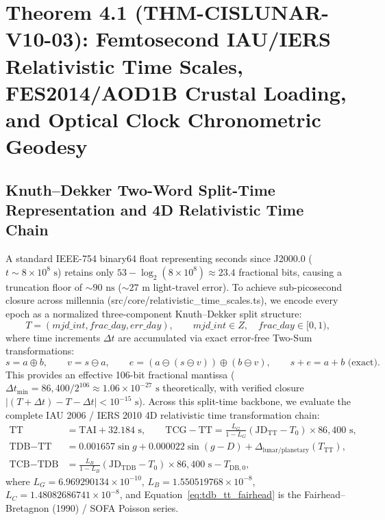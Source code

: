 \documentclass[11pt,a4paper,reqno]{article}
\def\texttt#1{#1}%
\def\mathcal#1{#1}%
\def\mathbb#1{#1}%
\theoremstyle{plain}
\theoremstyle{definition}
\theoremstyle{remark}
\numberwithin{equation}{section}
\begin{document}
\section{\texorpdfstring{Theorem 4.1 (\texttt{THM-CISLUNAR-V10-03}): Femtosecond IAU/IERS Relativistic Time Scales, FES2014/AOD1B Crustal Loading, and Optical Clock Chronometric Geodesy}{Theorem 4.1 (THM-CISLUNAR-V10-03): Femtosecond IAU/IERS Relativistic Time Scales, FES2014/AOD1B Crustal Loading, and Optical Clock Chronometric Geodesy}}

\subsection{Knuth--Dekker Two-Word Split-Time Representation and 4D Relativistic Time Chain}
A standard IEEE-754 \texttt{binary64} float representing seconds since J2000.0 ($t \sim 8 \times 10^8\text{ s}$) retains only $53 - \log_2(8 \times 10^8) \approx 23.4$ fractional bits, causing a truncation floor of $\sim 90\text{ ns}$ ($\sim 27\text{ m}$ light-travel error). To achieve sub-picosecond closure across millennia (\texttt{src/core/relativistic\_time\_scales.ts}), we encode every epoch as a normalized three-component Knuth--Dekker split structure:
\begin{equation}
  \mathcal{T} = (\texttt{mjd\_int}, \texttt{frac\_day}, \texttt{err\_day}), \qquad \texttt{mjd\_int} \in \mathbb{Z}, \quad \texttt{frac\_day} \in [0, 1),
  \label{eq:split_epoch}
\end{equation}
where time increments $\Delta t$ are accumulated via exact error-free Two-Sum transformations:
\begin{equation}
  s = a \oplus b, \qquad v = s \ominus a, \qquad e = (a \ominus (s \ominus v)) \oplus (b \ominus v), \qquad s + e = a + b \text{ (exact)}.
  \label{eq:knuth_twosum}
\end{equation}
This provides an effective 106-bit fractional mantissa ($\Delta t_{\min} = 86,400 / 2^{106} \approx 1.06 \times 10^{-27}\text{ s}$ theoretically, with verified closure $|(\mathcal{T} + \Delta t) - \mathcal{T} - \Delta t| < 10^{-15}\text{ s}$). Across this split-time backbone, we evaluate the complete IAU 2006 / IERS 2010 4D relativistic time transformation chain:
\begin{align}
  \text{TT} &= \text{TAI} + 32.184\text{ s}, \qquad \text{TCG} - \text{TT} = \frac{L_G}{1 - L_G}(\text{JD}_{\text{TT}} - T_0) \times 86,400\text{ s}, \label{eq:tcg_tt} \\
  \text{TDB} - \text{TT} &= 0.001657\sin g + 0.000022\sin(g - D) + \Delta_{\text{lunar/planetary}}(T_{\text{TT}}), \label{eq:tdb_tt_fairhead} \\
  \text{TCB} - \text{TDB} &= \frac{L_B}{1 - L_B}(\text{JD}_{\text{TDB}} - T_0) \times 86,400\text{ s} - T_{\text{DB},0}, \label{eq:tcb_tdb}
\end{align}
where $L_G = 6.969290134 \times 10^{-10}$, $L_B = 1.550519768 \times 10^{-8}$, $L_C = 1.48082686741 \times 10^{-8}$, and Equation~\eqref{eq:tdb_tt_fairhead} is the Fairhead--Bretagnon (1990) / SOFA Poisson series.
\end{document}
